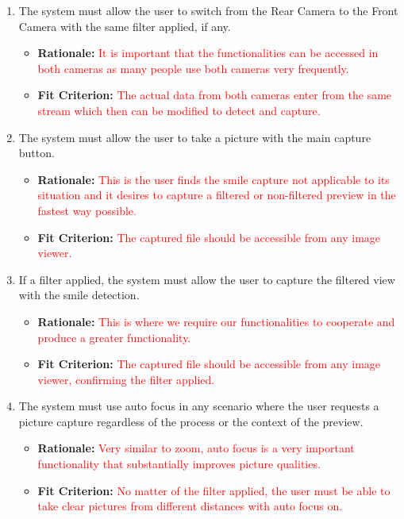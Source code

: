 \documentclass[12pt, titlepage]{article}
\begin{document}
{\begin{enumerate}[{REQ}1.]
	\begin{itemize}
		\item \textbf{Rationale:}  \textcolor{red}{Without the basic functionalities, the new features might not seem as enticing any more.}
		\item \textbf{Fit Criterion:}   \textcolor{red}{The user can verify the picture zoom by reviewing the photo.}
	\end{itemize}
\item The system must allow the user to switch from the Rear Camera to the Front Camera with the same filter applied, if any. 
	\begin{itemize}
		\item \textbf{Rationale:}  \textcolor{red}{It is important that the functionalities can be accessed in both cameras as many people use both cameras very frequently.}
		\item \textbf{Fit Criterion:}   \textcolor{red}{The actual data from both cameras enter from the same stream which then can be modified to detect and capture. }
	\end{itemize}
\item The system must allow the user to take a picture with the main capture button.
	\begin{itemize}
		\item \textbf{Rationale:}  \textcolor{red}{This is the user finds the smile capture not applicable to its situation and it desires to capture a filtered or non-filtered preview in the fastest way possible.}
		\item \textbf{Fit Criterion:}   \textcolor{red}{The captured file should be accessible from any image viewer.}
	\end{itemize}
\item If a filter applied, the system must allow the user to capture the filtered view with the smile detection. 
	\begin{itemize}
		\item \textbf{Rationale:}  \textcolor{red}{This is where we require our functionalities to cooperate and produce a greater functionality.}
		\item \textbf{Fit Criterion:}   \textcolor{red}{The captured file should be accessible from any image viewer, confirming the filter applied.}
	\end{itemize}
\item The system must use auto focus in any scenario where the user requests a picture capture regardless of the process or the context of the preview.
	\begin{itemize}
		\item \textbf{Rationale:}  \textcolor{red}{Very similar to zoom, auto focus is a very important functionality that substantially improves picture qualities.}
		\item \textbf{Fit Criterion:}   \textcolor{red}{No matter of the filter applied, the user must be able to take clear pictures from different distances with auto focus on.}
	\end{itemize}
\end{enumerate}
}
\end{document}
